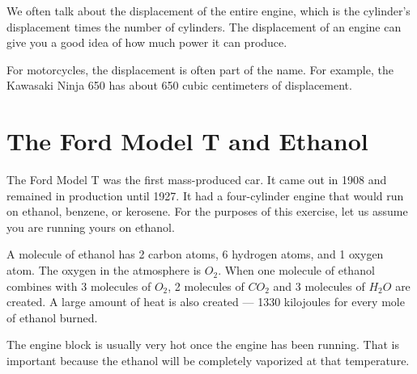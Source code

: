 We often talk about the displacement of the entire engine, which is the
 cylinder's displacement times the number of cylinders. The displacement of an engine can give you a
 good idea of how much power it can produce.
 
For motorcycles, the displacement is often part of the name. For example, the Kawasaki Ninja 650 has about 650 cubic centimeters of displacement. 

\section{The Ford Model T and Ethanol}

The Ford Model T was the first mass-produced car. It came out in 1908 and remained in production until 1927. It had a four-cylinder engine that would run on ethanol, benzene, or kerosene. For the purposes of this exercise, let us assume you are running yours on ethanol.

A molecule of ethanol has 2 carbon atoms, 6 hydrogen atoms, and 1 oxygen atom. The oxygen in the atmosphere is $O_2$.  When one molecule of ethanol combines with 3 molecules of $O_2$, 2 molecules of $CO_2$ and 3 molecules of $H_2O$ are created. A large amount of heat is also created --- 1330 kilojoules for every mole of ethanol burned.

The engine block is usually very hot once the engine has been running. That is important because the ethanol will be completely vaporized at that temperature.

